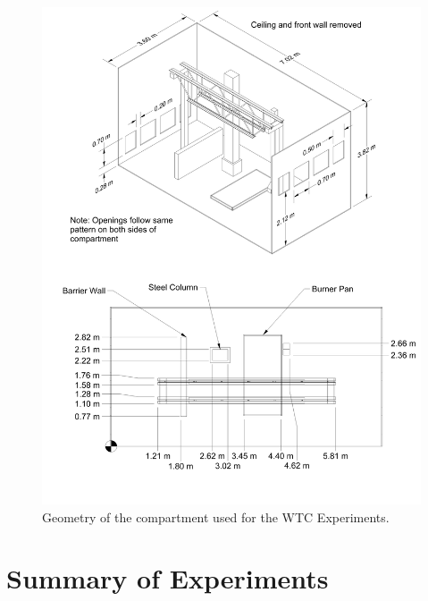 \begin{figure}[p]
\begin{center}
\includegraphics[width=\textwidth]{FIGURES/WTC/WTC}
\end{center}
\caption[Geometry of the WTC Experiments]{Geometry of the compartment used for the WTC Experiments.}
\label{WTC_Drawing}
\end{figure}

\clearpage







\section{Summary of Experiments}

\label{experiment_summary}

